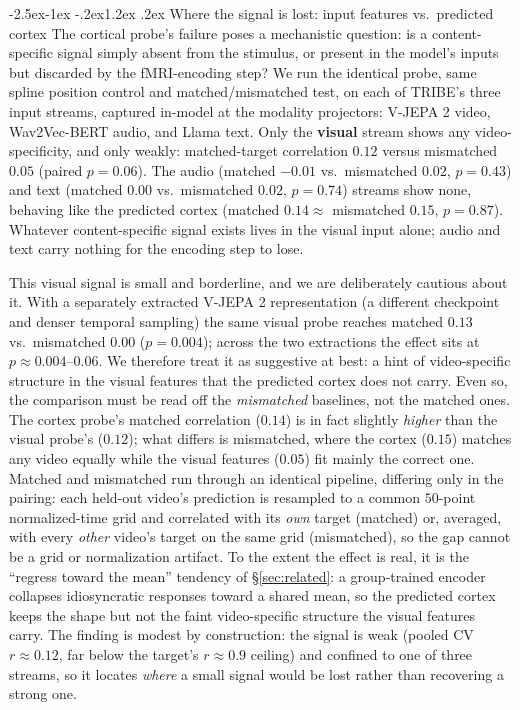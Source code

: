 \documentclass[11pt]{article}
\makeatletter
\renewcommand\subsection{\@startsection{subsection}{2}{\z@}%
  {-2.5ex\@plus -1ex \@minus -.2ex}{1.2ex \@plus .2ex}%
  {\normalfont\normalsize\sffamily\bfseries}}
\makeatother
\begin{document}
\subsection{Where the signal is lost: input features vs.\ predicted cortex}\label{sec:features}
The cortical probe's failure poses a mechanistic question: is a content-specific signal simply
absent from the stimulus, or present in the model's inputs but discarded by the fMRI-encoding step?
We run the identical probe, same spline position control and matched/mismatched test, on each of
TRIBE's three input streams, captured in-model at the modality projectors: V-JEPA 2 video,
Wav2Vec-BERT audio, and Llama text. Only the \textbf{visual} stream shows any video-specificity, and
only weakly: matched-target correlation $0.12$ versus mismatched $0.05$
(paired $p=0.06$). The audio (matched $-0.01$ vs.\ mismatched $0.02$, $p=0.43$) and text (matched
$0.00$ vs.\ mismatched $0.02$, $p=0.74$) streams show none, behaving like the predicted cortex
(matched $0.14 \approx$ mismatched $0.15$, $p=0.87$). Whatever content-specific signal exists lives
in the visual input alone; audio and text carry nothing for the encoding step to lose.

This visual signal is small and borderline, and we are deliberately cautious about it. With a
separately extracted V-JEPA 2 representation (a different checkpoint and denser temporal sampling)
the same visual probe reaches matched $0.13$ vs.\ mismatched $0.00$ ($p=0.004$); across the two
extractions the effect sits at $p\approx0.004$--$0.06$. We therefore treat it as suggestive at best:
a hint of video-specific structure in the visual features that the predicted cortex does not carry. Even so, the comparison must be read off the \emph{mismatched} baselines, not
the matched ones. The cortex probe's matched correlation ($0.14$) is in fact slightly \emph{higher}
than the visual probe's ($0.12$); what differs is mismatched, where the cortex ($0.15$) matches any
video equally while the visual features ($0.05$) fit mainly the correct one. Matched and mismatched
run through an identical pipeline, differing only in the pairing: each held-out video's prediction is
resampled to a common $50$-point normalized-time grid and correlated with its \emph{own} target
(matched) or, averaged, with every \emph{other} video's target on the same grid (mismatched), so the
gap cannot be a grid or normalization artifact. To the extent the effect is real, it is the ``regress
toward the mean'' tendency of \S\ref{sec:related}: a group-trained encoder collapses
idiosyncratic responses toward a shared mean, so the predicted cortex keeps the shape but not the
faint video-specific structure the visual features carry. The finding is modest by construction: the
signal is weak (pooled CV $r\approx0.12$, far below the target's $r\approx0.9$ ceiling) and confined
to one of three streams, so it locates \emph{where} a small signal would be lost rather than
recovering a strong one.
\end{document}
